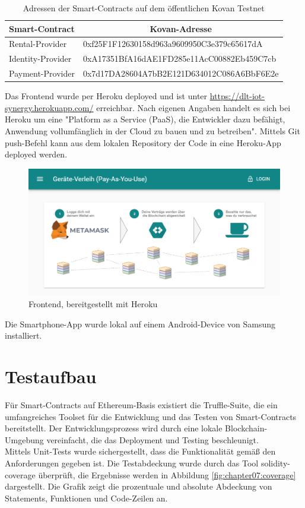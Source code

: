 \begin{table}[]
\begin{tabular}{@{}ll@{}}
\toprule
\textbf{Smart-Contract} & \multicolumn{1}{c}{\textbf{Kovan-Adresse}} \\ \midrule
Rental-Provider & 0xf25F1F12630158d963a9609950C3e379c65617dA \\
Identity-Provider & 0xA17351BfA16dAE1FD285e11AcC00882Eb459C7cb \\
Payment-Provider & 0x7d17DA28604A7bB2E121D634012C086A6BbF6E2e \\ \bottomrule
\end{tabular}
\caption{Adressen der Smart-Contracts auf dem öffentlichen Kovan Testnet}
\label{tab:addresses}
\end{table}

Das Frontend wurde per Heroku deployed und ist unter \url{https://dlt-iot-synergy.herokuapp.com/} erreichbar. Nach eigenen Angaben handelt es sich bei Heroku um eine "Platform as a Service (PaaS), die Entwickler dazu befähigt, Anwendung vollumfänglich in der Cloud zu bauen und zu betreiben". Mittels Git push-Befehl kann aus dem lokalen Repository der Code in eine Heroku-App deployed werden.

\begin{figure}[h]
 \centering
 \includegraphics[width=1.0\textwidth]{gfx/screenshots/frontend.PNG}
 \caption{Frontend, bereitgestellt mit Heroku}
 \label{fig:chapter07:frontend}
\end{figure}

Die Smartphone-App wurde lokal auf einem Android-Device von Samsung installiert.

\section{Testaufbau}
\label{sec:implementation:poc:testing}
Für Smart-Contracts auf Ethereum-Basis existiert die Truffle-Suite, die ein umfangreiches Toolset für die Entwicklung und das Testen von Smart-Contracts bereitstellt. Der Entwicklungsprozess wird durch eine lokale Blockchain-Umgebung vereinfacht, die das Deployment und Testing beschleunigt.\\
Mittels Unit-Tests wurde sichergestellt, dass die Funktionalität gemäß den Anforderungen gegeben ist. Die Testabdeckung wurde durch das Tool solidity-coverage überprüft, die Ergebnisse werden in Abbildung \ref{fig:chapter07:coverage} dargestellt. Die Grafik zeigt die prozentuale und absolute Abdeckung von Statements, Funktionen und Code-Zeilen an.\\

